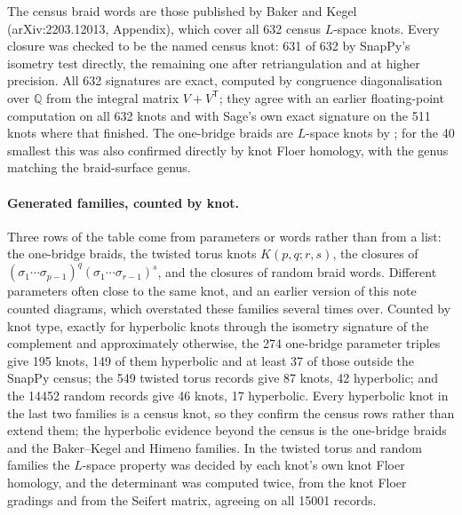 \documentclass[11pt]{article}
\theoremstyle{definition}
\begin{document}
\noindent The census braid words are those published by Baker and Kegel (arXiv:2203.12013, Appendix), which cover all
632 census $L$-space knots. Every closure was checked to be the named census knot: 631 of 632 by SnapPy's isometry test
directly, the remaining one after retriangulation and at higher precision. All 632 signatures are exact, computed by
congruence diagonalisation over $\mathbb{Q}$ from the integral matrix $V + V^{\mathsf T}$; they agree with an earlier
floating-point computation on all 632 knots and with Sage's own exact signature on the 511 knots where that finished.
The one-bridge braids are $L$-space knots by \cite{GLV}; for the 40 smallest this was also confirmed directly by knot
Floer homology, with the genus matching the braid-surface genus.

\paragraph{Generated families, counted by knot.} Three rows of the table come from parameters or words rather than
from a list: the one-bridge braids, the twisted torus knots $K(p,q;r,s)$, the closures of
$(\sigma_1 \cdots \sigma_{p-1})^q (\sigma_1 \cdots \sigma_{r-1})^s$, and the closures of random braid words. Different
parameters often close to the same knot, and an earlier version of this note counted diagrams, which overstated these
families several times over. Counted by knot type, exactly for hyperbolic knots through the isometry signature of the
complement and approximately otherwise, the 274 one-bridge parameter triples give 195 knots, 149 of them
hyperbolic and at least 37 of those outside the SnapPy census; the 549 twisted torus records give 87
knots, 42 hyperbolic; and the 14452 random records give 46 knots, 17 hyperbolic. Every hyperbolic
knot in the last two families is a census knot, so they confirm the census rows rather than extend them; the hyperbolic
evidence beyond the census is the one-bridge braids and the Baker--Kegel and Himeno families. In the twisted torus and
random families the $L$-space property was decided by each knot's own knot Floer homology, and the determinant was
computed twice, from the knot Floer gradings and from the Seifert matrix, agreeing on all 15001 records.
\end{document}
